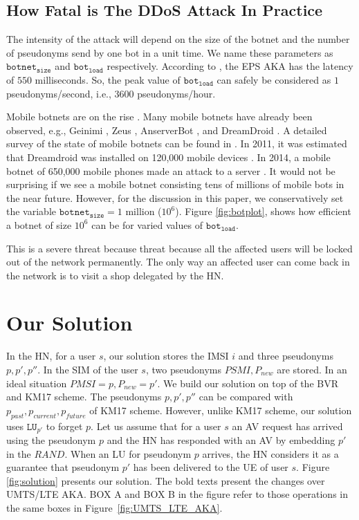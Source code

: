 \documentclass{llncs} %
\begin{document}
\subsection{How Fatal is The DDoS Attack In Practice} \label{sec:how_fatal_ddos}
The intensity of the attack will depend on the size of the botnet and the number of pseudonyms send by one bot in a unit time. We name these parameters as $\texttt{botnet}_{\texttt{size}}$ and $\texttt{bot}_{\texttt{load}}$ respectively. According to \cite{thesislund}, the EPS AKA has the latency of $550$ milliseconds. So, the peak value of $\texttt{bot}_{\texttt{load}}$ can safely be considered as $1$ pseudonyms/second, i.e., 3600 pseudonyms/hour.

Mobile botnets are on the rise \cite{botnet_ccs09_symbian,botnet_usenix11,botnet_australia_2016}. Many mobile botnets have already been observed, e.g., Geinimi \cite{botnet_geinimi10}, Zeus \cite{botnet_zeus11}, AnserverBot \cite{botnet_anserverbot}, and DreamDroid \cite{botnet_dreamdroid11}. A detailed survey of the state of mobile botnets can be found in \cite{botnet_threat15}. In 2011, it was estimated that Dreamdroid was installed on 120,000 mobile devices \cite{botnet_dreamdroid11}. In 2014, a mobile botnet of 650,000 mobile phones made an attack to a server \cite{chinese_spam}. It would not be surprising if we see a mobile botnet consisting tens of millions of mobile bots in the near future. However, for the discussion in this paper, we conservatively set the variable $\texttt{botnet}_{\texttt{size}} = 1$ million ($10^6$). Figure \ref{fig:botplot}, shows how efficient a botnet of size $10^6$ can be for varied values of $\texttt{bot}_{\texttt{load}}$. 

This is a severe threat because threat because all the affected users will be locked out of the network permanently. The only way an affected user can come back in the network is to visit a shop delegated by the HN. 



\section{Our Solution}
In the HN, for a user $s$, our solution stores the IMSI $i$ and three pseudonyms $p,p',p''$. In the SIM of the user $s$, two pseudonyms $PSMI,P_{new}$ are stored. In an ideal situation $PMSI = p, P_{new} = p'$. We build our solution on top of the BVR and KM17 scheme. The pseudonyms $p,p',p''$ can be compared with $p_{past},p_{current},p_{future}$ of KM17 scheme. However, unlike KM17 scheme, our solution uses $\texttt{LU}_{p'}$ to forget $p$. Let us assume that for a user $s$ an AV request has arrived using the pseudonym $p$ and the HN has responded with an AV by embedding $p'$ in the $RAND$. When an LU for pseudonym $p$ arrives, the HN considers it as a guarantee that pseudonym $p'$ has been delivered to the UE of user $s$.  Figure \ref{fig:solution} presents our solution. The bold texts present the changes over UMTS/LTE AKA. BOX A and BOX B in the figure refer to those operations in the same boxes in Figure~\ref{fig:UMTS_LTE_AKA}.
\end{document}
